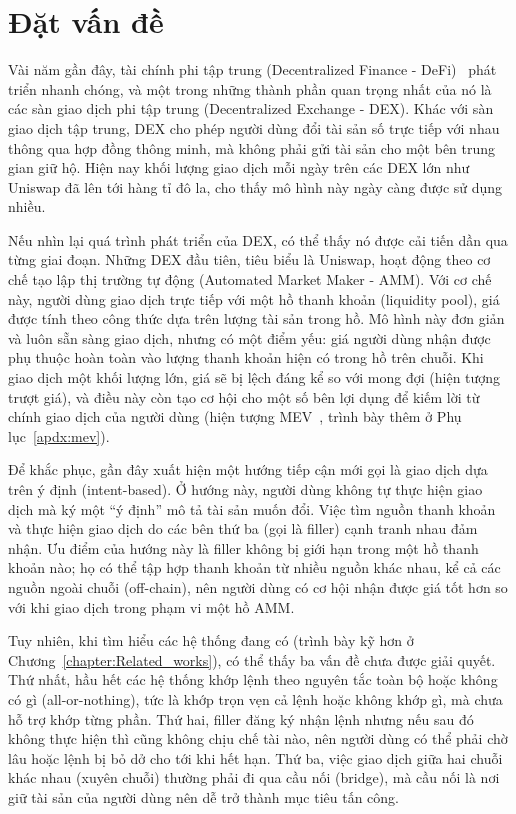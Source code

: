 \documentclass[../DoAn.tex]{subfiles}
\begin{document}
\section{Đặt vấn đề}
\label{section:1.1}

Vài năm gần đây, tài chính phi tập trung (Decentralized Finance - DeFi)~\cite{werner2022sok} phát triển nhanh chóng, và một trong những thành phần quan trọng nhất của nó là các sàn giao dịch phi tập trung (Decentralized Exchange - DEX). Khác với sàn giao dịch tập trung, DEX cho phép người dùng đổi tài sản số trực tiếp với nhau thông qua hợp đồng thông minh, mà không phải gửi tài sản cho một bên trung gian giữ hộ. Hiện nay khối lượng giao dịch mỗi ngày trên các DEX lớn như Uniswap đã lên tới hàng tỉ đô la, cho thấy mô hình này ngày càng được sử dụng nhiều.

Nếu nhìn lại quá trình phát triển của DEX, có thể thấy nó được cải tiến dần qua từng giai đoạn. Những DEX đầu tiên, tiêu biểu là Uniswap, hoạt động theo cơ chế tạo lập thị trường tự động (Automated Market Maker - AMM). Với cơ chế này, người dùng giao dịch trực tiếp với một hồ thanh khoản (liquidity pool), giá được tính theo công thức dựa trên lượng tài sản trong hồ. Mô hình này đơn giản và luôn sẵn sàng giao dịch, nhưng có một điểm yếu: giá người dùng nhận được phụ thuộc hoàn toàn vào lượng thanh khoản hiện có trong hồ trên chuỗi. Khi giao dịch một khối lượng lớn, giá sẽ bị lệch đáng kể so với mong đợi (hiện tượng trượt giá), và điều này còn tạo cơ hội cho một số bên lợi dụng để kiếm lời từ chính giao dịch của người dùng (hiện tượng MEV~\cite{daian2020flashboys}, trình bày thêm ở Phụ lục~\ref{apdx:mev}).

Để khắc phục, gần đây xuất hiện một hướng tiếp cận mới gọi là giao dịch dựa trên ý định (intent-based). Ở hướng này, người dùng không tự thực hiện giao dịch mà ký một ``ý định'' mô tả tài sản muốn đổi. Việc tìm nguồn thanh khoản và thực hiện giao dịch do các bên thứ ba (gọi là filler) cạnh tranh nhau đảm nhận. Ưu điểm của hướng này là filler không bị giới hạn trong một hồ thanh khoản nào; họ có thể tập hợp thanh khoản từ nhiều nguồn khác nhau, kể cả các nguồn ngoài chuỗi (off-chain), nên người dùng có cơ hội nhận được giá tốt hơn so với khi giao dịch trong phạm vi một hồ AMM.

Tuy nhiên, khi tìm hiểu các hệ thống đang có (trình bày kỹ hơn ở Chương~\ref{chapter:Related_works}), có thể thấy ba vấn đề chưa được giải quyết. Thứ nhất, hầu hết các hệ thống khớp lệnh theo nguyên tắc toàn bộ hoặc không có gì (all-or-nothing), tức là khớp trọn vẹn cả lệnh hoặc không khớp gì, mà chưa hỗ trợ khớp từng phần. Thứ hai, filler đăng ký nhận lệnh nhưng nếu sau đó không thực hiện thì cũng không chịu chế tài nào, nên người dùng có thể phải chờ lâu hoặc lệnh bị bỏ dở cho tới khi hết hạn. Thứ ba, việc giao dịch giữa hai chuỗi khác nhau (xuyên chuỗi) thường phải đi qua cầu nối (bridge), mà cầu nối là nơi giữ tài sản của người dùng nên dễ trở thành mục tiêu tấn công.
\end{document}
